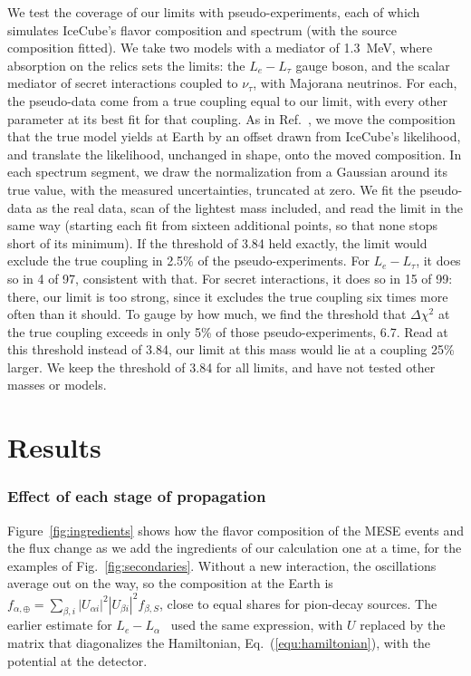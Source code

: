 \documentclass[linenumbers, aps, prd, twocolumn, superscriptaddress, floatfix, longbibliography, nofootinbib, bibnotes]{revtex4-2}
\begin{document}
We test the coverage of our limits with pseudo-experiments, each of which simulates IceCube's flavor composition and spectrum (with the source composition fitted).
We take two models with a mediator of 1.3~MeV, where absorption on the relics sets the limits: the $L_e - L_\tau$ gauge boson, and the scalar mediator of secret interactions coupled to $\nu_\tau$, with Majorana neutrinos.
For each, the pseudo-data come from a true coupling equal to our limit, with every other parameter at its best fit for that coupling.
As in Ref.~\cite{Bustamante:2026fxa}, we move the composition that the true model yields at Earth by an offset drawn from IceCube's likelihood, and translate the likelihood, unchanged in shape, onto the moved composition.
In each spectrum segment, we draw the normalization from a Gaussian around its true value, with the measured uncertainties, truncated at zero.
We fit the pseudo-data as the real data, scan of the lightest mass included, and read the limit in the same way (starting each fit from sixteen additional points, so that none stops short of its minimum).
If the threshold of 3.84 held exactly, the limit would exclude the true coupling in 2.5\% of the pseudo-experiments.
For $L_e - L_\tau$, it does so in 4 of 97, consistent with that.
For secret interactions, it does so in 15 of 99: there, our limit is too strong, since it excludes the true coupling six times more often than it should.
To gauge by how much, we find the threshold that $\Delta\chi^2$ at the true coupling exceeds in only 5\% of those pseudo-experiments, 6.7.
Read at this threshold instead of 3.84, our limit at this mass would lie at a coupling 25\% larger.
We keep the threshold of 3.84 for all limits, and have not tested other masses or models.

\section{Results}
\label{sec:results}

\subsubsection{Effect of each stage of propagation}
Figure~\ref{fig:ingredients} shows how the flavor composition of the MESE events and the flux change as we add the ingredients of our calculation one at a time, for the examples of Fig.~\ref{fig:secondaries}.
Without a new interaction, the oscillations average out on the way, so the composition at the Earth is $f_{\alpha,\oplus} = \sum_{\beta, i} |U_{\alpha i}|^2 |U_{\beta i}|^2 f_{\beta,S}$, close to equal shares for pion-decay sources.
The earlier estimate for $L_e - L_\alpha$~\cite{Agarwalla:2023sng} used the same expression, with $U$ replaced by the matrix that diagonalizes the Hamiltonian, Eq.~(\ref{equ:hamiltonian}), with the potential at the detector.
\end{document}
